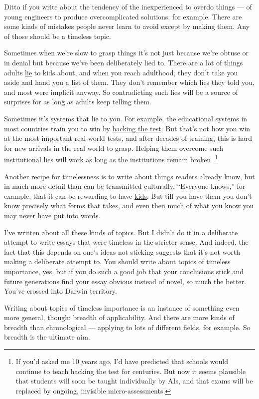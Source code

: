 Ditto if you write about the tendency of the inexperienced to overdo
things --- of young engineers to produce overcomplicated solutions, for
example. There are some kinds of mistakes people never learn to avoid
except by making them. Any of those should be a timeless topic.

Sometimes when we're slow to grasp things it's not just because we're
obtuse or in denial but because we've been deliberately lied to. There
are a lot of things adults \href{lies.html}{lie} to kids about, and when
you reach adulthood, they don't take you aside and hand you a list of
them. They don't remember which lies they told you, and most were
implicit anyway. So contradicting such lies will be a source of
surprises for as long as adults keep telling them.

Sometimes it's systems that lie to you. For example, the educational
systems in most countries train you to win by \href{lesson.html}{hacking
the test}. But that's not how you win at the most important real-world
tests, and after decades of training, this is hard for new arrivals in
the real world to grasp. Helping them overcome such institutional lies
will work as long as the institutions remain broken.
\footnote{If you'd asked me 10 years ago, I'd have predicted that schools
would continue to teach hacking the test for centuries. But now it seems
plausible that students will soon be taught individually by AIs, and
that exams will be replaced by ongoing, invisible micro-assessments.}

Another recipe for timelessness is to write about things readers already
know, but in much more detail than can be transmitted culturally.
``Everyone knows,'' for example, that it can be rewarding to have
\href{kids.html}{kids}. But till you have them you don't know precisely
what forms that takes, and even then much of what you know you may never
have put into words.

I've written about all these kinds of topics. But I didn't do it in a
deliberate attempt to write essays that were timeless in the stricter
sense. And indeed, the fact that this depends on one's ideas not
sticking suggests that it's not worth making a deliberate attempt to.
You should write about topics of timeless importance, yes, but if you do
such a good job that your conclusions stick and future generations find
your essay obvious instead of novel, so much the better. You've crossed
into Darwin territory.

Writing about topics of timeless importance is an instance of something
even more general, though: breadth of applicability. And there are more
kinds of breadth than chronological --- applying to lots of different
fields, for example. So breadth is the ultimate aim.

